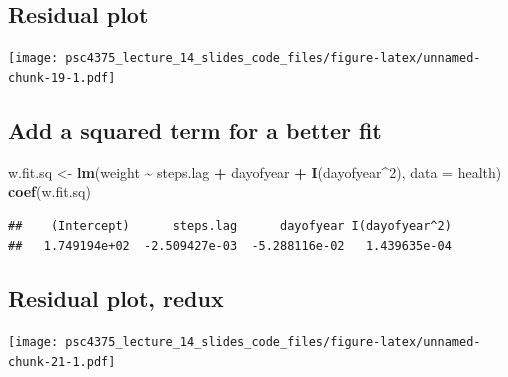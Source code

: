 \documentclass[
]{article}
\newenvironment{Shaded}{\begin{snugshade}}{\end{snugshade}}
\newcommand{\AttributeTok}[1]{\textcolor[rgb]{0.13,0.29,0.53}{#1}}
\newcommand{\DecValTok}[1]{\textcolor[rgb]{0.00,0.00,0.81}{#1}}
\newcommand{\FunctionTok}[1]{\textcolor[rgb]{0.13,0.29,0.53}{\textbf{#1}}}
\newcommand{\NormalTok}[1]{#1}
\newcommand{\OtherTok}[1]{\textcolor[rgb]{0.56,0.35,0.01}{#1}}
\newcommand{\SpecialCharTok}[1]{\textcolor[rgb]{0.81,0.36,0.00}{\textbf{#1}}}
\begin{document}
\subsection{Residual plot}\label{residual-plot}

\texttt{[image: psc4375\_lecture\_14\_slides\_code\_files/figure-latex/unnamed-chunk-19-1.pdf]}

\subsection{Add a squared term for a better
fit}\label{add-a-squared-term-for-a-better-fit}

\begin{Shaded}
\begin{Highlighting}[]
\NormalTok{w.fit.sq }\OtherTok{\textless{}{-}} \FunctionTok{lm}\NormalTok{(weight }\SpecialCharTok{\textasciitilde{}}\NormalTok{ steps.lag }\SpecialCharTok{+}\NormalTok{ dayofyear }\SpecialCharTok{+} \FunctionTok{I}\NormalTok{(dayofyear}\SpecialCharTok{\^{}}\DecValTok{2}\NormalTok{), }\AttributeTok{data =}\NormalTok{ health)}
\FunctionTok{coef}\NormalTok{(w.fit.sq)}
\end{Highlighting}
\end{Shaded}

\begin{verbatim}
##    (Intercept)      steps.lag      dayofyear I(dayofyear^2) 
##   1.749194e+02  -2.509427e-03  -5.288116e-02   1.439635e-04
\end{verbatim}

\subsection{Residual plot, redux}\label{residual-plot-redux}

\texttt{[image: psc4375\_lecture\_14\_slides\_code\_files/figure-latex/unnamed-chunk-21-1.pdf]}
\end{document}

